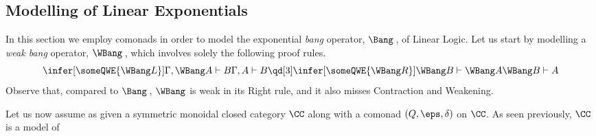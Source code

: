 \documentclass[12pt]{article}
\begin{document}
\subsection{Modelling of Linear Exponentials}
%
In this section we employ comonads in order to model the exponential \emph{bang} operator, $\Bang$\,, of Linear Logic. Let us start by modelling
a \emph{weak bang} operator, $\WBang$\,, which involves solely the following proof rules.
\[
\infer[\someQWE{\WBang L}]{\Gamma,\WBang A\vdash B}{\Gamma,A\vdash B}\qd[3]\infer[\someQWE{\WBang R}]{\WBang B\vdash\WBang A}{\WBang B\vdash A}
\]
Observe that, compared to $\Bang$\,, $\WBang$ is weak in its Right rule, and it also misses Contraction and Weakening.

Let us now assume as given a symmetric monoidal closed category $\CC$ along with a comonad $(Q,\eps,\delta)$ on $\CC$. As seen previously, $\CC$ is a model of
\end{document}
